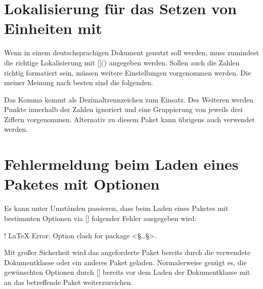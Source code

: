 \section{Lokalisierung für das Setzen von Einheiten mit }
%
%
%
Wenn  in einem deutschsprachigen Dokument genutzt soll
werden, muss zumindest die richtige Lokalisierung mit
[]() angegeben werden. 
Sollen auch die Zahlen richtig formatiert sein, müssen weitere Einstellungen 
vorgenommen werden. Die meiner Meinung nach besten sind die folgenden.
%
\begin{quoting}
\begin{Code}
\end{Code}
\end{quoting}
%
Das Komma kommt als Dezimaltrennzeichen zum Einsatz. Des Weiteren werden Punkte 
innerhalb der Zahlen ignoriert und eine Gruppierung von jeweils drei Ziffern 
vorgenommen. Alternativ zu diesem Paket kann übrigens auch  
verwendet werden.



\section{Fehlermeldung beim Laden eines Paketes mit Optionen}
%
Es kann unter Umständen passieren, dass beim Laden eines Paketes mit bestimmten 
Optionen via [] 
folgender Fehler ausgegeben wird:
%
\begin{quoting}
\begin{Code}[escapechar=§]
! LaTeX Error: Option clash for package <§\dots§>.
\end{Code}
\end{quoting}
%
Mit großer Sicherheit wird das angeforderte Paket bereits durch die verwendete 
Dokumentklasse oder ein anderes Paket geladen. Normalerweise genügt es, die 
gewünschten Optionen durch 
[] 
bereits vor dem Laden der Dokumentklasse mit  an das 
betreffende Paket weiterzureichen.



